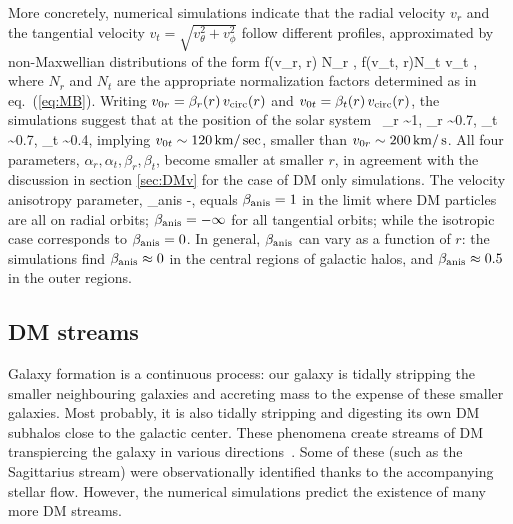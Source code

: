 More concretely, numerical simulations indicate that the radial velocity $v_r$ and the tangential velocity $v_t = \sqrt{v_\theta^2 + v_\phi^2}$
follow different profiles, approximated by non-Maxwellian distributions of the form
\beq 
f(v_r, r) \approx N_r \exp{},\qquad
 f(v_t, r)\approx N_t v_t  \exp{},
\eeq
where $N_r$ and $N_t$ are the appropriate normalization factors determined as in eq.~(\ref{eq:MB}).
Writing $v_{0r}= \beta_r(r) \, v_{\rm circ}(r)$ 
and  $v_{0t}= \beta_t(r) \, v_{\rm circ}(r)$, the simulations suggest that at the position of the solar system~\cite{fvNbody} 
\beq 
\alpha_r \sim 1, \qquad \beta_r \sim 0.7, \qquad
\alpha_t \sim0.7, \qquad \beta_t \sim 0.4,
\eeq
implying $v_{0t}  \sim 120 \,{\rm km}/\sec$, smaller than 
$v_{0r}\sim 200 \,{\rm km}/\,{\rm s}$.
All four parameters, $ \alpha_r,\alpha_t,\beta_r,\beta_t$, become smaller at smaller $r$, in agreement with the discussion in section \ref{sec:DMv} for the case of DM only simulations. 
The velocity anisotropy parameter, 
\beq
\label{eq:vanisotropyparam}
\beta_{\rm anis} -,
\eeq
equals 
$\beta_{\rm anis} = 1$ in the limit  where DM particles are all on radial orbits;
$\beta_{\rm anis}=-\infty$ for all tangential orbits;
while the isotropic case corresponds to $\beta_{\rm anis} = 0$. 
In general, $\beta_{\rm anis}$ can vary as a function of $r$: the
simulations find $\beta_{\rm anis} \approx 0$ in the central regions of galactic halos, and $\beta_{\rm anis} \approx 0.5$ in the outer regions.



\subsection{DM streams}\label{sec:DMstreams}  
Galaxy formation is a continuous process: our galaxy is tidally stripping the smaller neighbouring galaxies and accreting mass to the expense of these smaller galaxies. Most probably, it is also tidally stripping and digesting its own DM subhalos close to the galactic center. These phenomena create streams of DM transpiercing the galaxy in various directions~\cite{streams}. Some of these (such as the Sagittarius stream) were observationally identified thanks to the accompanying stellar flow. However, the numerical simulations predict the existence of many more DM streams.
  
